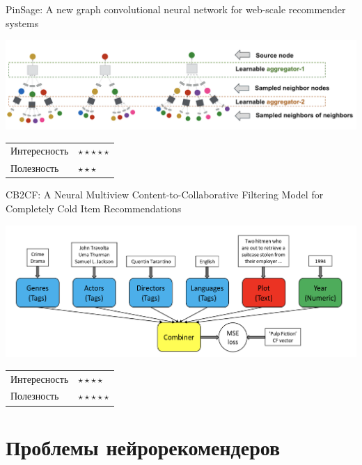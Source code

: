 \documentclass[11pt,aspectratio=169]{beamer}
\begin{document}
\begin{frame}{PinSage: A new graph convolutional neural network for web-scale recommender systems \cite{PINSAGE}}

\begin{center}
\includegraphics[scale=0.3]{images/pinnersage.png}
\end{center}

\begin{tabular}{l l}
Интересность & $\star\star\star\star\star$ \\
Полезность & $\star\star\star$
\end{tabular}

\end{frame}

\begin{frame}{CB2CF: A Neural Multiview Content-to-Collaborative Filtering Model for Completely Cold Item Recommendations	 \cite{CB2CF}}

\begin{center}
\includegraphics[scale=0.4]{images/cf2cf.png}
\end{center}

\begin{tabular}{l l}
Интересность & $\star\star\star\star$ \\
Полезность & $\star\star\star\star\star$
\end{tabular}

\end{frame}

\section{Проблемы нейрорекомендеров}
\end{document}
